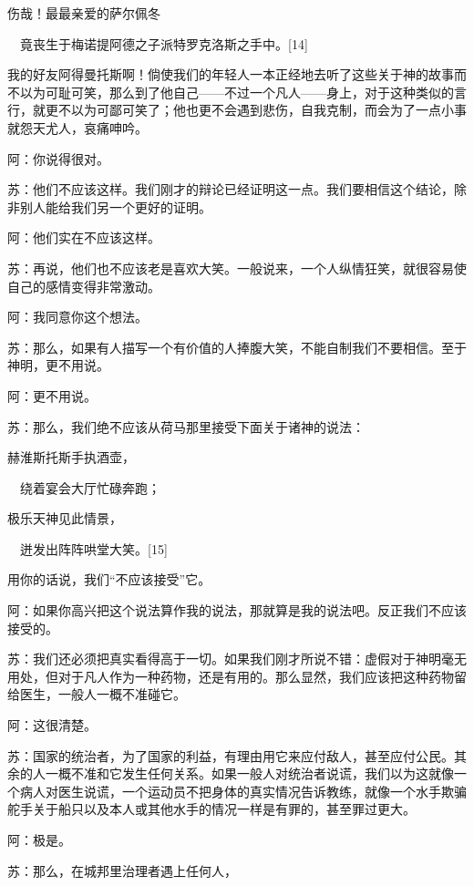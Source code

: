 \documentclass[12pt,oneside]{book}
\begin{document}
伤哉！最最亲爱的萨尔佩冬

　竟丧生于梅诺提阿德之子派特罗克洛斯之手中。[14]





我的好友阿得曼托斯啊！倘使我们的年轻人一本正经地去听了这些关于神的故事而不以为可耻可笑，那么到了他自己——不过一个凡人——身上，对于这种类似的言行，就更不以为可鄙可笑了；他也更不会遇到悲伤，自我克制，而会为了一点小事就怨天尤人，哀痛呻吟。

阿：你说得很对。

苏：他们不应该这样。我们刚才的辩论已经证明这一点。我们要相信这个结论，除非别人能给我们另一个更好的证明。

阿：他们实在不应该这样。

苏：再说，他们也不应该老是喜欢大笑。一般说来，一个人纵情狂笑，就很容易使自己的感情变得非常激动。

阿：我同意你这个想法。

苏：那么，如果有人描写一个有价值的人捧腹大笑，不能自制我们不要相信。至于神明，更不用说。

阿：更不用说。

苏：那么，我们绝不应该从荷马那里接受下面关于诸神的说法：





赫淮斯托斯手执酒壶，

　绕着宴会大厅忙碌奔跑；

极乐天神见此情景，

　迸发出阵阵哄堂大笑。[15]





用你的话说，我们“不应该接受”它。

阿：如果你高兴把这个说法算作我的说法，那就算是我的说法吧。反正我们不应该接受的。

苏：我们还必须把真实看得高于一切。如果我们刚才所说不错：虚假对于神明毫无用处，但对于凡人作为一种药物，还是有用的。那么显然，我们应该把这种药物留给医生，一般人一概不准碰它。

阿：这很清楚。

苏：国家的统治者，为了国家的利益，有理由用它来应付敌人，甚至应付公民。其余的人一概不准和它发生任何关系。如果一般人对统治者说谎，我们以为这就像一个病人对医生说谎，一个运动员不把身体的真实情况告诉教练，就像一个水手欺骗舵手关于船只以及本人或其他水手的情况一样是有罪的，甚至罪过更大。

阿：极是。

苏：那么，在城邦里治理者遇上任何人，
\end{document}
